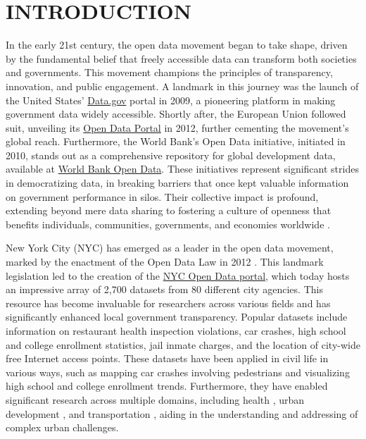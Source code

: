 \documentclass[12pt, titlepage]{article}
\begin{document}
\section{INTRODUCTION} 
\label{sec:intro}
In the early 21st century, the open data movement began 
to take shape, driven by the fundamental belief that 
freely accessible data can transform both societies and 
governments. This movement champions the principles
of transparency, innovation, and public engagement. 
A landmark in this journey was the launch of the United States'
\href{https://www.data.gov}{Data.gov} portal in 2009, a pioneering
platform in making government data widely accessible. Shortly after,
the European Union followed suit, unveiling its
\href{https://data.europa.eu/euodp}{Open Data Portal} in 2012, further
cementing the movement's global reach. Furthermore, the World Bank's Open
Data initiative, initiated in 2010, stands out as a comprehensive
repository for global development data, available at
\href{https://data.worldbank.org}{World Bank Open Data}. 
These initiatives represent significant strides in democratizing data, 
in breaking barriers that once kept valuable information 
on government performance in silos. Their collective impact 
is profound, extending beyond mere data sharing to 
fostering a culture of openness that benefits individuals, 
communities, governments, and economies worldwide 
\citep{barns2016mine, wang2016adoption}.


New York City (NYC) has emerged as a leader in the open data movement,
marked by the enactment of the Open Data Law in 2012
\citep{zuiderwijk2014open}. This landmark legislation led to the
creation of the \href{https://opendata.cityofnewyork.us}{NYC Open Data
  portal}, which today hosts an impressive array of 2,700 datasets
from 80 different city agencies. This resource has become invaluable
for researchers across various fields and has significantly enhanced
local government transparency. Popular datasets include information on
restaurant health inspection violations, car crashes, high school and
college enrollment statistics, jail inmate charges, and the location
of city-wide free Internet access points. These datasets have been
applied in civil life in various ways, such as mapping car crashes
involving pedestrians and visualizing high school and college
enrollment trends. Furthermore, they have enabled significant research
across multiple domains, including health \citep{cantor2018facets,
  shankar2021data}, urban development \citep{neves2020impacts}, and
transportation \citep{gerte2019understanding}, aiding in the
understanding and addressing of complex urban challenges.
\end{document}
